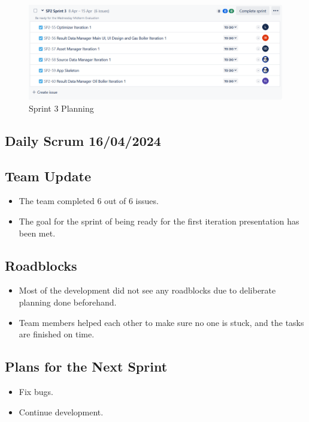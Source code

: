 \documentclass[12pt]{report}
\begin{document}
\begin{figure}[H]
  \centering
  \includegraphics[width=1\textwidth]{Resources/3-Sprint/Planning/Sprint3Planning.png}
  \caption{Sprint 3 Planning}
  \label{fig:S3Planning-image}
\end{figure}

\subsection*{Daily Scrum 16/04/2024}
\subsection*{Team Update}
\begin{itemize}
    \item The team completed 6 out of 6 issues.
    \item The goal for the sprint of being ready for the first iteration presentation has been met.
\end{itemize}

\subsection*{Roadblocks}
\begin{itemize}
    \item Most of the development did not see any roadblocks due to deliberate planning done beforehand.
    \item Team members helped each other to make sure no one is stuck, and the tasks are finished on time.
\end{itemize}

\subsection*{Plans for the Next Sprint}
\begin{itemize}
    \item Fix bugs.
    \item Continue development.
\end{itemize}
\end{document}

